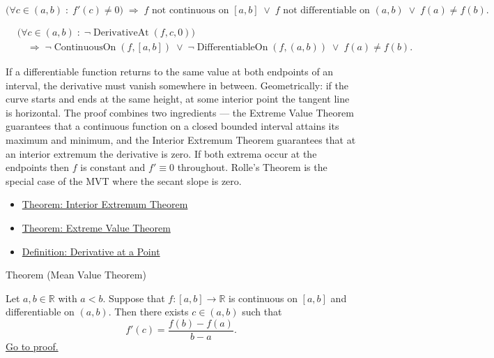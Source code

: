 \begin{remark*}
\[
\bigl(\forall c \in (a,b)\;:\; f'(c) \ne 0\bigr)
\;\Rightarrow\;
f \text{ not continuous on } [a,b]
\;\lor\;
f \text{ not differentiable on } (a,b)
\;\lor\;
f(a) \ne f(b).
\]
\end{remark*}

\begin{remark*}
\begin{align*}
&\bigl(\forall c\in(a,b)\;:\;\neg\operatorname{DerivativeAt}(f,c,0)\bigr)\\
&\quad\Longrightarrow\;
\neg\operatorname{ContinuousOn}(f,[a,b])
\;\lor\;
\neg\operatorname{DifferentiableOn}(f,(a,b))
\;\lor\;
f(a)\ne f(b).
\end{align*}
\end{remark*}

\begin{remark*}[Interpretation]
If a differentiable function returns to the same value at both endpoints of an interval, the derivative must vanish somewhere in between. Geometrically: if the curve starts and ends at the same height, at some interior point the tangent line is horizontal. The proof combines two ingredients --- the Extreme Value Theorem guarantees that a continuous function on a closed bounded interval attains its maximum and minimum, and the Interior Extremum Theorem guarantees that at an interior extremum the derivative is zero. If both extrema occur at the endpoints then $f$ is constant and $f' \equiv 0$ throughout. Rolle's Theorem is the special case of the MVT where the secant slope is zero.
\end{remark*}

\begin{remark*}[Dependencies]
\begin{itemize}
  \item \hyperref[thm:interior-extremum-theorem]{Theorem: Interior Extremum Theorem}
  \item \hyperref[thm:extreme-value-theorem]{Theorem: Extreme Value Theorem}
  \item \hyperref[def:derivative-at-a-point]{Definition: Derivative at a Point}
\end{itemize}
\end{remark*}


\begin{theorembox}{Theorem (Mean Value Theorem)}
\begin{theorem}
\label{thm:mean-value-theorem}
Let $a, b \in \mathbb{R}$ with $a < b$. Suppose that $f : [a,b] \to \mathbb{R}$ is continuous on $[a,b]$ and differentiable on $(a,b)$. Then there exists $c \in (a,b)$ such that
\[
f'(c) = \frac{f(b) - f(a)}{b - a}.
\]
\hyperref[prf:mean-value-theorem]{Go to proof.}
\end{theorem}
\end{theorembox}

